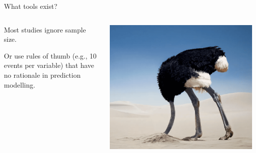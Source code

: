 \documentclass[11pt]{beamer}
\newcommand{\bgap}{\vspace{0.8em}}
\begin{document}
\begin{frame}[t]{What tools exist?}
	\centering
	\begin{columns}
		\begin{column}[c]{0.6\textwidth}
			\centering
			Most studies ignore sample size.
			\bgap%

			Or use rules of thumb (e.g., 10 events per variable) that have no
			rationale in prediction modelling\autocite{vansmeden2016}.
		\end{column}
		\begin{column}[c]{0.4\textwidth}
			\includegraphics[width=\textwidth]{figures/bury-head.png}%
		\end{column}
	\end{columns}

	\bgap


\end{frame}
\end{document}
